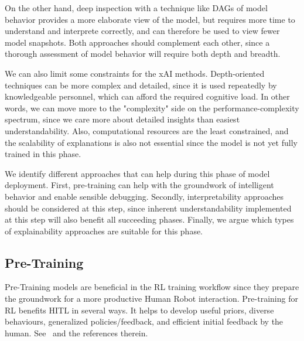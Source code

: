\documentclass[twoside,11pt]{article}
\begin{document}
On the other hand, deep inspection with a technique like DAGs of model behavior provides a more elaborate view of the model, but requires more time to understand and interprete correctly, and can therefore be used to view fewer model snapshots. Both approaches should complement each other, since a thorough assessment of model behavior will require both depth and breadth.

We can also limit some constraints for the xAI methods. Depth-oriented techniques can be more complex and detailed, since it is used repeatedly by knowledgeable personnel, which can afford the required cognitive load. In other words, we can move more to the "complexity" side on the performance-complexity spectrum, since we care more about detailed insights than easiest understandability. Also, computational resources are the least constrained, and the scalability of explanations is also not essential since the model is not yet fully trained in this phase.

We identify different approaches that can help during this phase of model deployment. First, pre-training can help with the groundwork of intelligent behavior and enable sensible debugging. Secondly, interpretability approaches should be considered at this step, since inherent understandability implemented at this step will also benefit all succeeding phases. Finally, we argue which types of explainability approaches are suitable for this phase.

\subsection{Pre-Training}
Pre-Training models are beneficial in the RL training workflow since they prepare the groundwork for a more productive Human Robot interaction. Pre-training for RL benefits HITL in several ways. It helps to 
develop useful priors, diverse behaviours, generalized policies/feedback, and efficient initial feedback by the human. See~\cite{LeeSmithAbbeel:2021:FeedbackPreferenceHITLLearningPEBBLE,hazan2019provably,daniel2016hierarchical,florensa2017stochastic,eysenbach2018diversity} and the references therein.
\end{document}
